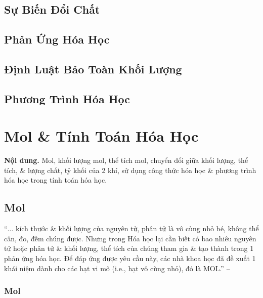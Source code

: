 \documentclass{article}
\numberwithin{equation}{section}
\begin{document}
\subsection{Sự Biến Đổi Chất}


\subsection{Phản Ứng Hóa Học}


\subsection{Định Luật Bảo Toàn Khối Lượng}


\subsection{Phương Trình Hóa Học}


\section{Mol \& Tính Toán Hóa Học}
\textsf{\textbf{Nội dung.} Mol, khối lượng mol, thể tích mol, chuyển đổi giữa khối lượng, thể tích, \& lượng chất, tỷ khối của 2 khí, sử dụng công thức hóa học \& phương trình hóa học trong tính toán hóa học.}

\subsection{Mol}
``$\ldots$ kích thước \& khối lượng của nguyên tử, phân tử là vô cùng nhỏ bé, không thể cân, đo, đếm chúng được. Nhưng trong Hóa học lại cần biết có bao nhiêu nguyên tử hoặc phân tử \& khối lượng, thể tích của chúng tham gia \& tạo thành trong 1 phản ứng hóa học. Để đáp ứng được yêu cầu này, các nhà khoa học đã đề xuất 1 khái niệm dành cho các hạt vi mô (i.e., hạt vô cùng nhỏ), đó là MOL.'' -- \cite[p. 63]{SGK_Hoa_Hoc_8}

\subsubsection{Mol}
\end{document}
